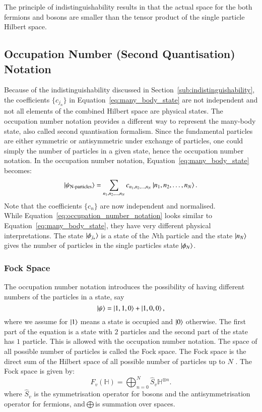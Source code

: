 The principle of indistinguishability results in that the actual space for the both fermions and bosons are smaller than the tensor product of the single particle Hilbert space.


\subsection{Occupation Number (Second Quantisation) Notation}
\label{sub:occupation_number_notation}

Because of the indistinguishability discussed in Section~\ref{sub:indistinguishability}, the coefficients $ \{ c_{j_{n}} \}  $ in Equation~\eqref{eq:many_body_state} are not independent and not all elements of the combined Hilbert space are physical states. The occupation number notation provides a different way to represent the many-body state, also called second quantisation formalism. Since the fundamental particles are either symmetric or antisymmetric under exchange of particles, one could simply the number of particles in a given state, hence the occupation number notation. In the occupation number notation, Equation~\eqref{eq:many_body_state}
becomes:
\begin{equation}
	\label{eq:occupation_number_notation}
	\ket{\psi_{\text{N-particles}}} = \sum_{n_1, n_2, \ldots, n_N} c_{n_1, n_2, \ldots, n_N} \ket{n_1, n_2, \ldots, n_N}.
\end{equation}
Note that the coefficients $ \{ c_n \}  $ are now independent and normalised. \\
While Equation~\eqref{eq:occupation_number_notation} looks similar to Equation~\eqref{eq:many_body_state}, they have very different physical interpretations. The state $ \ket{\phi_{j_n}} $ is a state of the $ N $th particle and the state $ \ket{n_N} $ gives the number of particles in the single particles state $ \ket{\phi_N}  $.

\subsubsection{Fock Space}
\label{sub:fock_space}
The occupation number notation introduces the possibility of having different numbers of the particles in a state, say
\[ \ket{\psi} = \ket{1,1,0} + \ket{1,0,0}, \]
where we assume for $\ket{1}$ means a state is occupied and $\ket{0}$ otherwise. The first part of the equation is a state with $2$ particles and the second part of the state has $1$ particle. This is allowed with the occupation number notation.
The space of all possible number of particles is called the Fock space.
The Fock space is the direct sum of the Hilbert space of all possible number of particles up to $ N $ . The Fock space is given by:
\begin{equation}
	F_v(\mathbb{H}) = \bigoplus_{n=0}^{N} \hat S_v \mathbb{H}^{\otimes n}.
\end{equation}
where $ \hat S_v $ is the symmetrisation operator for bosons and the antisymmetrisation operator for fermions, and$ \bigoplus $is summation over spaces. 

